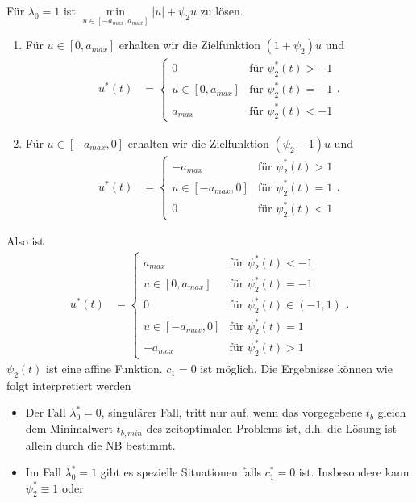 \begin{exmp}
Für $\lambda_0=1$ ist $\min\limits_{u\in[-a_{max},a_{max}]}|u|+\psi_2 u$ zu lösen.
\begin{enumerate}
  \item Für $u\in[0,a_{max}]$ erhalten wir die Zielfunktion $(1+\psi_2)u$ und
  \begin{align*}
  	u^{\ast}(t) & = \left\{\begin{array}{cl}
  	0 & \text{für }\psi_2^{\ast}(t) > -1\\
	u\in[0,a_{max}] & \text{für }\psi_2^{\ast}(t) = -1\\
	a_{max} & \text{für }\psi_2^{\ast}(t) < -1
  	\end{array} \right. .
  \end{align*}
  \item Für $u\in[-a_{max},0]$ erhalten wir die Zielfunktion $(\psi_2-1)u$ und
  \begin{align*}
  u^{\ast}(t) & = \left\{\begin{array}{cl}
  	-a_{max} & \text{für }\psi_2^{\ast}(t) > 1\\
	u\in[-a_{max},0] & \text{für }\psi_2^{\ast}(t) = 1\\
	0 & \text{für }\psi_2^{\ast}(t) < 1
  \end{array} \right. .
  \end{align*}
\end{enumerate}
Also ist 
\begin{align}
u^{\ast}(t) & = \left\{\begin{array}{cl}
a_{max} & \text{für }\psi_2^{\ast}(t) < -1\\
u\in[0,a_{max}] & \text{für }\psi_2^{\ast}(t) = -1\\
0 & \text{für }\psi_2^{\ast}(t) \in(-1,1)\\
u\in[-a_{max},0] & \text{für }\psi_2^{\ast}(t) = 1\\
-a_{max} & \text{für }\psi_2^{\ast}(t) > 1
\end{array} \right. . \label{eqn:kap_2_verbrau_opt_u}
\end{align}
$\psi_2(t)$ ist eine affine Funktion. $c_1=0$ ist möglich. Die Ergebnisse können wie folgt interpretiert werden
\begin{itemize}
  \item Der Fall $\lambda_0^{\ast}=0$, singulärer Fall, tritt nur auf, wenn das vorgegebene $t_b$ gleich dem Minimalwert $t_{b,min}$ des zeitoptimalen
  Problems ist, d.h. die Lösung ist allein durch die \ac{NB} bestimmt.  
  \item Im Fall $\lambda_0^{\ast}=1$ gibt es spezielle Situationen falls $c_1^{\ast}=0$ ist. Insbesondere kann $\psi_2^{\ast}\equiv 1$ oder

\end{itemize}
\end{exmp}
